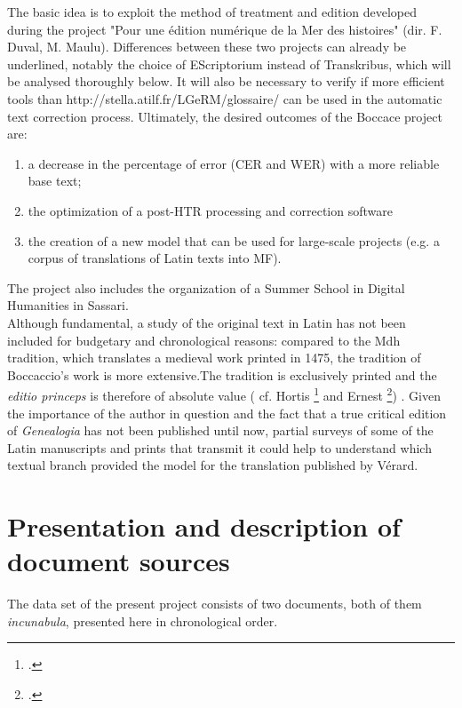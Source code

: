 \documentclass[12pt]{article}
\begin{document}
The basic idea is to exploit the method of treatment and edition developed during the project "Pour une édition numérique de la Mer des histoires" (dir. F. Duval, M. Maulu). Differences between these two projects can already be underlined, notably the choice of EScriptorium instead of Transkribus, which will be analysed thoroughly below. 
It will also be necessary to verify if more efficient tools than http://stella.atilf.fr/LGeRM/glossaire/ can be used in the automatic text correction process. 
Ultimately, the desired outcomes of the Boccace project  are: 
\begin{enumerate}
    \item a decrease in the percentage of error (CER and WER) with a more reliable base text;
    \item  the optimization of a post-HTR processing and correction software
    \item the creation of a new model that can be used for large-scale projects (e.g. a corpus of translations of Latin texts into MF).
\end{enumerate}

The project also includes  the organization of a Summer School in Digital Humanities in Sassari. \\


Although fundamental, a study of the original text in Latin has not been included for budgetary and chronological reasons: compared to the Mdh tradition, which translates a medieval work printed in 1475, the tradition of Boccaccio's work is more extensive.The tradition is exclusively printed and the \textit{editio princeps} is therefore of absolute value ( cf. Hortis \footcite{hortis1879} and Ernest \footcite{ernest1919}) . Given the importance of the author in question and the fact that a true critical edition of \textit{Genealogia} has not been published until now, partial surveys of some of the Latin manuscripts and prints that transmit it could help to understand which textual branch provided the model for the translation published by Vérard.

\clearpage

\section{Presentation and description of document sources}

The data set of the present project consists of two documents, both of them \textit{incunabula}, presented here in chronological order.\\
\end{document}
